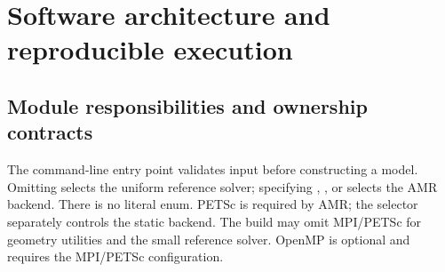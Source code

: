 \section{Software architecture and reproducible execution}
\subsection{Module responsibilities and ownership contracts}
The command-line entry point validates input before constructing a model.
Omitting  selects the uniform reference solver; specifying
, ,  or  selects the AMR
backend. There is no literal  enum. PETSc is required by AMR;
the  selector separately controls the static backend.
The build may omit MPI/PETSc for geometry utilities and the small reference
solver. OpenMP is optional and requires the MPI/PETSc configuration.

